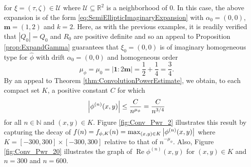 \documentclass[11pt, letter]{book}
\newenvironment{example}
  {\pushQED{\qed}\renewcommand{\qedsymbol}{$\triangle$}\examplex}
  {\popQED\endexamplex}
\renewcommand\Re{\operatorname{Re}}%
\begin{document}
\begin{example}
\begin{equation*}
\end{equation*}
for $\xi=(\tau,\zeta)\in\mathcal{U}$ where $\mathcal{U}\subseteq\mathbb{R}^2$ is a neighborhood of $0$. In this case, the above expansion is of the form \eqref{eq:SemiEllipticImaginaryExpansion} with $\alpha_0=(0,0)$, $\mathbf{m}=(1,2)$ and $k=2$. Here, as with the previous examples, it is readily verified that $|Q_0|=Q_0$ and $R_0$ are positive definite and so an appeal to Proposition \ref{prop:ExpandGamma} guarantees that $\xi_0=(0,0)$ is of imaginary homogeneous type for $\widehat{\phi}$ with drift $\alpha_0=(0,0)$ and homogeneous order
\begin{equation*}
    \mu_\phi=\mu_0=|\mathbf{1}:2\mathbf{m}|=
    \frac{1}{2}+\frac{1}{4}=\frac{3}{4}.
\end{equation*}
By an appeal to Theorem \ref{thm:ConvolutionPowerEstimate}, we obtain, to each compact set $K$, a positive constant $C$ for which
\begin{equation}\label{eq:SecondOrderExampleDecay2}
    \abs{\phi^{(n)}(x,y)}\leq\frac{C}{n^{\mu_\phi}}=\frac{C}{n^{3/4}}
\end{equation}
for all $n\in\mathbb{N}$ and $(x,y)\in K$. Figure \ref{fig:Conv_Pwr_2} illustrates this result by capturing the decay of $f(n)=f_{\phi,K}(n)=\max_{(x,y)\in K}\abs{\phi^{(n)}(x,y)}$ where %
$K=[-300,300]\times [-300,300]$ relative to that of $n^{-\mu_\phi}$. Also, Figure \ref{fig:Conv_Pwr_20} illustrates the graph of $\Re \phi^{(n)}(x,y)$ for $(x,y)\in K$ and $n=300$ and $n=600$.



\end{example}
\end{document}

